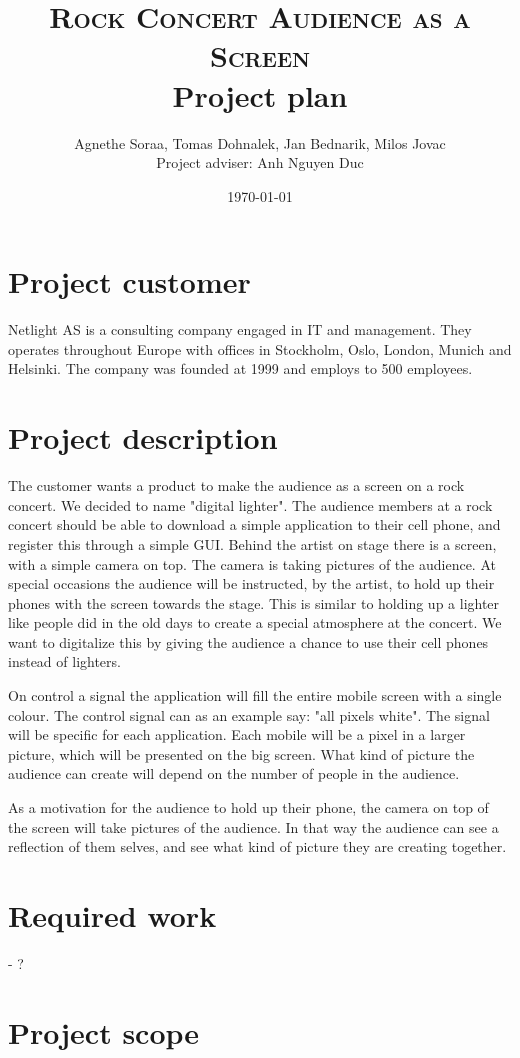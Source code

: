 \documentclass{article}
\title{
    \normalsize \textsc{Rock Concert Audience as a Screen}\\
    \Huge Project plan}
\author{Agnethe Soraa,
Tomas Dohnalek,
Jan Bednarik,
Milos Jovac \\
\normalsize Project adviser: Anh Nguyen Duc}
\date{\today}
\begin{document}
\maketitle
\section{Project customer}
Netlight AS is a consulting company engaged in IT and management. They operates throughout Europe with offices in Stockholm, Oslo, London, Munich and Helsinki. The company was founded at 1999 and employs to 500 employees.

\section{Project description}
The customer wants a product to make the audience as a screen on a rock concert. We decided to name "digital lighter". 
The audience members at a rock concert should be able to download a simple application to their cell phone, and register this through a simple GUI.
Behind the artist on stage there is a screen, with a simple camera on top. The camera is taking pictures of the audience. 
At special occasions the audience will be instructed, by the artist, to hold up their phones with the screen towards the stage.
This is similar to holding up a lighter like people did in the old days to create a special atmosphere at the concert. 
We want to digitalize this by giving the audience a chance to use their cell phones instead of lighters. 

On control a signal the application will fill the entire mobile screen with a single colour.
The control signal can as an example say: "all pixels white". The signal will be specific for each application.
Each mobile will be a pixel in a larger picture, which will be presented on the big screen. 
What kind of picture the audience can create will depend on the number of people in the audience.   

As a motivation for the audience to hold up their phone, the camera on top of the screen will take pictures of the audience.
In that way the audience can see a reflection of them selves, and see what kind of picture they are creating together.  

\section{Required work}
- ?


\section{Project scope}
\end{document}
